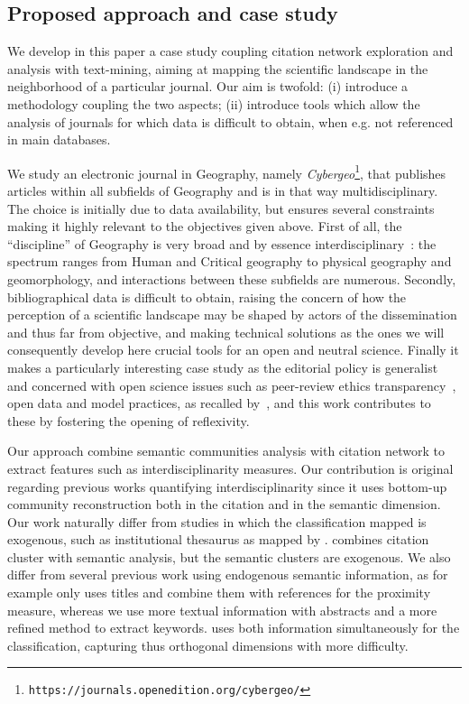 \documentclass[10pt]{article}
\begin{document}
\subsection*{Proposed approach and case study}

We develop in this paper a case study coupling citation network exploration and analysis with text-mining, aiming at mapping the scientific landscape in the neighborhood of a particular journal. Our aim is twofold: (i) introduce a methodology coupling the two aspects; (ii) introduce tools which allow the analysis of journals for which data is difficult to obtain, when e.g. not referenced in main databases.

We study an electronic journal in Geography, namely \textit{Cybergeo}\footnote{\texttt{https://journals.openedition.org/cybergeo/}}, that publishes articles within all subfields of Geography and is in that way multidisciplinary. The choice is initially due to data availability, but ensures several constraints making it highly relevant to the objectives given above. First of all, the ``discipline'' of Geography is very broad and by essence interdisciplinary~\citep{bracken2016interdisciplinarity}: the spectrum ranges from Human and Critical geography to physical geography and geomorphology, and interactions between these subfields are numerous. Secondly, bibliographical data is difficult to obtain, raising the concern of how the perception of a scientific landscape may be shaped by actors of the dissemination and thus far from objective, and making technical solutions as the ones we will consequently develop here crucial tools for an open and neutral science. Finally it makes a particularly interesting case study as the editorial policy is generalist and concerned with open science issues such as peer-review ethics transparency~\citep{10.1371/journal.pone.0147913}, open data and model practices, as recalled by~\cite{pumain2015adapting}, and this work contributes to these by fostering the opening of reflexivity.


Our approach combine semantic communities analysis with citation network to extract features such as interdisciplinarity measures. Our contribution is original regarding previous works quantifying interdisciplinarity since it uses bottom-up community reconstruction both in the citation and in the semantic dimension. Our work naturally differ from studies in which the classification mapped is exogenous, such as institutional thesaurus as mapped by \cite{boyack2017thesaurus}. \cite{zhang2010journal} combines citation cluster with semantic analysis, but the semantic clusters are exogenous. We also differ from several previous work using endogenous semantic information, as \cite{vugteveen2014dynamics} for example only uses titles and combine them with references for the proximity measure, whereas we use more textual information with abstracts and a more refined method to extract keywords. \cite{bouveyron2016stochastic} uses both information simultaneously for the classification, capturing thus orthogonal dimensions with more difficulty.
\end{document}
